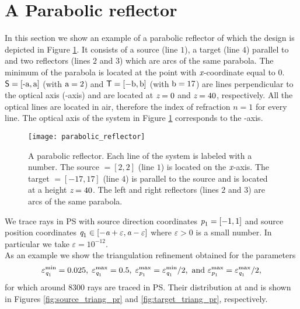 \section{A Parabolic reflector}
In this section we show an example of a parabolic reflector of which the design is depicted in Figure \ref{fig:PR}.
 It consists of a source  (line $1$), a target  (line $4$) parallel to  and two reflectors (lines $2$ and $3$) which are arcs of the same parabola. 
  The minimum of the parabola is located at the point with $\textit{x}$-coordinate equal to $0$. $\textsf{S}=[\textrm{-a}, \textrm{a}]$ (with $\textrm{a}=2$) and $\textsf{T}=[-\textrm{b},\textrm{b}]$ (with $\textrm{b}=17$) are lines perpendicular to the optical axis (-axis) and are located at $\textit{z}=0$ and $\textit{z}=40$, respectively.
All the optical lines are located in air, therefore the index of refraction ${n}=1$ for every line.
The optical axis of the system in Figure \ref{fig:PR} corresponds to the -axis.
\begin{figure}[h!]
\centering
\texttt{[image: parabolic\_reflector]}
\caption{\textrm{A parabolic reflector.}  Each line of the system is labeled with a number.
   The source $= [2,2]$ (line $1$) is located on the $\textit{x}$-axis.
   The target $= [-17, 17]$ (line $4$) is parallel to the source and is located at a height $ \textit{z}= 40$.
   The left and right reflectors (lines $2$ and $3$) are arcs of the same parabola.}
\label{fig:PR}
\end{figure}
We trace rays in PS with source direction coordinates $\textit{p}_1 = [-1,1]$ and source position coordinates $\textit{q}_1\in[-\textit{a}+\varepsilon,\textit{a}-\varepsilon]$ where $\varepsilon>0$ is a small number. In particular we take $\varepsilon = 10^{-12}$.\\ \indent As an example we show the triangulation refinement obtained for the parameters $$\varepsilon_{\textit{q}_1}^{\textrm{min}} = 0.025, \; \varepsilon_{\textit{q}_1}^{\textrm{max}} = 0.5, \; \varepsilon_{\textit{p}_1}^{\textrm{max}} = \varepsilon_{\textit{q}_1}^{\textrm{min}}/2, \mbox{ and }  \varepsilon_{\textit{p}_1}^{\textrm{max}} = \varepsilon_{\textit{q}_1}^{\textrm{max}}/2, $$ for which around $8300$ rays are traced in PS. Their distribution at  and  is shown in Figures \ref{fig:source_triang_pr} and \ref{fig:target_triang_pr}, respectively. 
